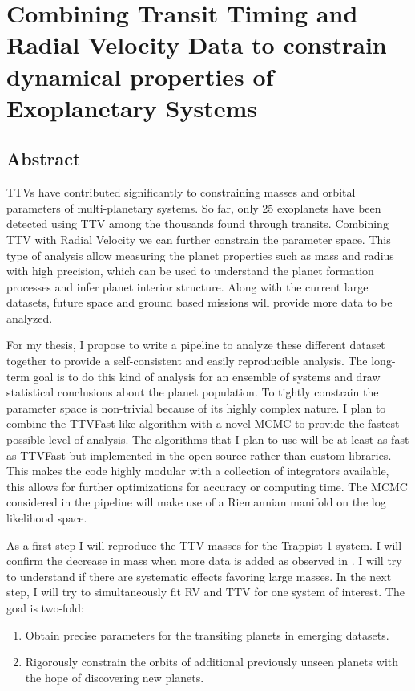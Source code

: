 \section{Combining Transit Timing and Radial Velocity Data to constrain dynamical properties of Exoplanetary Systems}

\subsection{Abstract}
TTVs have contributed significantly to constraining masses and orbital parameters of multi-planetary systems.
So far, only 25 exoplanets have been detected using TTV among the thousands found through transits.
Combining TTV with Radial Velocity we can further constrain the parameter space.
This type of analysis allow  measuring the planet properties such as mass and radius with high precision, which can be used to understand the planet formation processes and infer planet interior structure. 
Along with the current large datasets, future space and ground based missions will provide more data to be analyzed.

For my thesis, I propose to write a pipeline to analyze these different dataset together to provide a self-consistent and easily reproducible analysis. 
The long-term goal is to do this kind of analysis for an ensemble of systems and draw statistical conclusions about the planet population.
To tightly constrain the parameter space is non-trivial because of its highly complex nature.
I plan to combine the TTVFast-like algorithm with a novel MCMC to provide the fastest possible level of analysis.
The algorithms that I plan to use will be at least as fast as TTVFast but implemented in the open source \reb rather than custom libraries.
This makes the code highly modular with a collection of integrators available, this allows for further optimizations for accuracy or computing time.
The MCMC considered in the pipeline will make use of a Riemannian manifold on the log likelihood space.

As a first step I will reproduce the TTV masses for the Trappist 1 system. 
I will confirm the decrease in mass when more data is added as observed in \cite{1704.04290}.
I will try to understand if there are systematic effects favoring large masses.
In the next step, I will try to simultaneously fit RV and TTV for one system of interest. 
The goal is two-fold:
\begin{enumerate} 
	\item Obtain precise parameters for the transiting planets in emerging datasets.
	\item Rigorously constrain the orbits of additional previously unseen planets with the hope of discovering new planets.
\end{enumerate}
